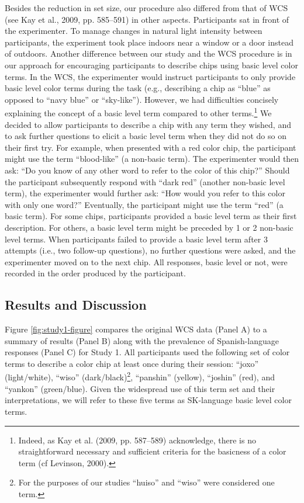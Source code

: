 \documentclass[
  ,apa7,floatsintext]{apa6}
\begin{document}
Besides the reduction in set size, our procedure also differed from that of WCS (see Kay et al., 2009, pp. 585--591) in other aspects. Participants sat in front of the experimenter. To manage changes in natural light intensity between participants, the experiment took place indoors near a window or a door instead of outdoors. Another difference between our study and the WCS procedure is in our approach for encouraging participants to describe chips using basic level color terms. In the WCS, the experimenter would instruct participants to only provide basic level color terms during the task (e.g., describing a chip as ``blue'' as opposed to ``navy blue'' or ``sky-like''). However, we had difficulties concisely explaining the concept of a basic level term compared to other terms.\footnote{ Indeed, as Kay et al. (2009, pp. 587--589) acknowledge, there is no straightforward necessary and sufficient criteria for the basicness of a color term (cf Levinson, 2000).} We decided to allow participants to describe a chip with any term they wished, and to ask further questions to elicit a basic level term when they did not do so on their first try. For example, when presented with a red color chip, the participant might use the term ``blood-like'' (a non-basic term). The experimenter would then ask: ``Do you know of any other word to refer to the color of this chip?'' Should the participant subsequently respond with ``dark red'' (another non-basic level term), the experimenter would further ask: ``How would you refer to this color with only one word?'' Eventually, the participant might use the term ``red'' (a basic term). For some chips, participants provided a basic level term as their first description. For others, a basic level term might be preceded by 1 or 2 non-basic level terms. When participants failed to provide a basic level term after 3 attempts (i.e., two follow-up questions), no further questions were asked, and the experimenter moved on to the next chip. All responses, basic level or not, were recorded in the order produced by the participant.

\hypertarget{results-and-discussion}{%
\subsection{Results and Discussion}\label{results-and-discussion}}

Figure \ref{fig:study1-figure} compares the original WCS data (Panel A) to a summary of results (Panel B) along with the prevalence of Spanish-language responses (Panel C) for Study 1. All participants used the following set of color terms to describe a color chip at least once during their session: ``joxo'' (light/white), ``wiso'' (dark/black)\footnote{For the purposes of our studies ``huiso'' and ``wiso'' were considered one term.}, ``panshin'' (yellow), ``joshin'' (red), and ``yankon'' (green/blue). Given the widespread use of this term set and their interpretations, we will refer to these five terms as SK-language basic level color terms.
\end{document}
